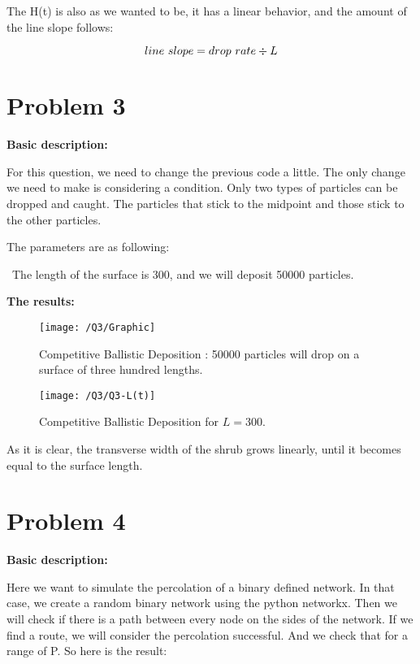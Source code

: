 \documentclass{article}
\begin{document}
    The H(t) is also as we wanted to be, it has a linear behavior,
    and the amount of the line slope follows:
    
    \begin{equation}
        \centering
        line \ slope = drop \ rate \div L
    \end{equation}

    \pagebreak
    \section*{Problem 3}
    \textbf{Basic description:}

    For this question, we need to change the previous code a little.
    The only change we need to make is considering a condition.
    Only two types of particles can be dropped and caught.
    The particles that stick to the midpoint and those stick to the other particles.

    The parameters are as following:

    \textbullet \ The length of the surface is 300, and we will deposit 50000 particles.

    \textbf{The results:}

    \begin{figure}[!htb]
        \centering
        \texttt{[image: /Q3/Graphic]}
        \label{fig:3.1}
        \caption{Competitive Ballistic Deposition :
        50000 particles will drop on a surface of three hundred lengths.}
    \end{figure}

    \begin{figure}[!htb]
        \centering
        \texttt{[image: /Q3/Q3-L(t)]}
        \label{fig:3.2}
        \caption{Competitive Ballistic Deposition for $L=300$.}
    \end{figure}

    As it is clear, the transverse width of the shrub grows linearly,
    until it becomes equal to the surface length.

    \pagebreak
    \section*{Problem 4}
    \textbf{Basic description:}

    Here we want to simulate the percolation of a binary defined network.
    In that case, we create a random binary network using the python networkx.
    Then we will check if there is a path between every node on the sides of the network.
    If we find a route, we will consider the percolation successful. And we check that for a range of P.
    So here is the result:
\end{document}
